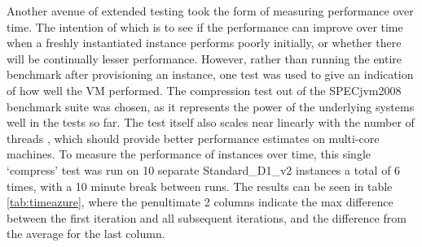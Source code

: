 \documentclass{entcs} \usepackage{entcsmacro}
\begin{document}
Another avenue of extended testing took the form of measuring performance over time. The intention of which is to see if the performance can improve over time when a freshly instantiated instance performs poorly initially, or whether there will be continually lesser performance. However, rather than running the entire benchmark after provisioning an instance, one test was used to give an indication of how well the VM performed. The compression test out of the SPECjvm2008 benchmark suite was chosen, as it represents the power of the underlying systems well in the tests so far. The test itself also scales near linearly with the number of threads \cite{shiv2009specjvm2008}, which should provide better performance estimates on multi-core machines. To measure the performance of instances over time, this single `compress' test was run on 10 separate Standard\_D1\_v2 instances a total of 6 times, with a 10 minute break between runs. The results can be seen in table \ref{tab:timeazure}, where the penultimate 2 columns indicate the max difference between the first iteration and all subsequent iterations, and the difference from the average for the last column.
\end{document}
